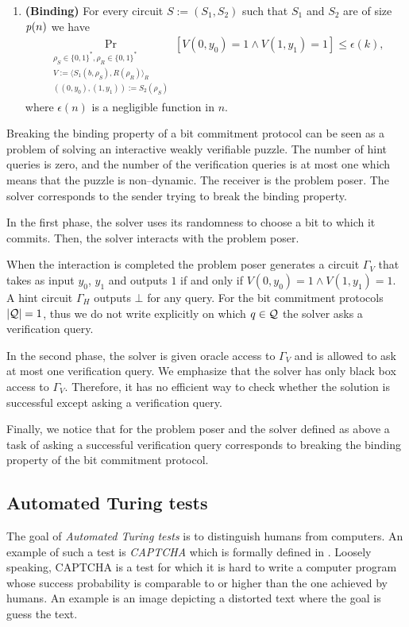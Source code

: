 \begin{definition}
\begin{enumerate}[]
\item{\textnormal{\textbf{(Binding)}}}
  For every circuit $S := (S_1, S_2)$ such that $S_1$ and $S_2$ are of size $\operatorname{\mathit{p}}(n)$ we have
  \begin{align*}
    \underset{\substack{
        \rho_S \in \{0,1\}^{*}, \rho_R \in \{0,1\}^{*} \\
        V := \langle S_1(b,\rho_S), R(\rho_R) \rangle_{R} \\ ((0, y_0), (1, y_1)) := S_2(\rho_S)}}{\Pr}[V(0,y_0) = 1 \land V(1,y_1) = 1] \leq \epsilon(k),
  \end{align*}
  where $\epsilon(n)$ is a negligible function in $n$.
\end{enumerate}
\end{definition}

Breaking the binding property of a bit commitment protocol can be seen as a problem of solving
an interactive weakly verifiable puzzle.
The number of hint queries is zero, and the number of the verification queries is at most one which means that the puzzle is non--dynamic.
The receiver is the problem poser. The solver corresponds to the sender trying to break the binding property.

In the first phase, the solver uses its randomness to choose a bit to which it commits.
Then, the solver interacts with the problem poser.

When the interaction is completed the problem poser generates a circuit $\Gamma_V$ that takes as input $y_0$, $y_1$ and outputs $1$
if and only if $V(0,y_0) = 1 \land V(1,y_1) = 1$. A hint circuit $\Gamma_H$ outputs $\bot$ for any query.
For the bit commitment protocols $|\mathcal{Q}| = 1$, thus we do not write explicitly on which $q \in \mathcal{Q}$ the solver asks a verification query.

In the second phase, the solver is given oracle access to $\Gamma_V$ and is allowed to ask at most one verification query.
We emphasize that the solver has only black box access to $\Gamma_V$. Therefore, it has no efficient way to check whether
the solution is successful except asking a verification query.

Finally, we notice that for the problem poser and the solver defined as above a task of asking a successful verification query
corresponds to breaking the binding property of the bit commitment protocol.

\subsection{Automated Turing tests}
The goal of \textit{Automated Turing tests} is to distinguish humans from computers.
An example of such a test is \textit{CAPTCHA} which is formally defined in \cite{von2003captcha}.
Loosely speaking, CAPTCHA is a test for which it is hard to write a computer program whose success
probability is comparable to or higher than the one achieved by humans.
An example is an image depicting a distorted text where the goal is guess the text.

